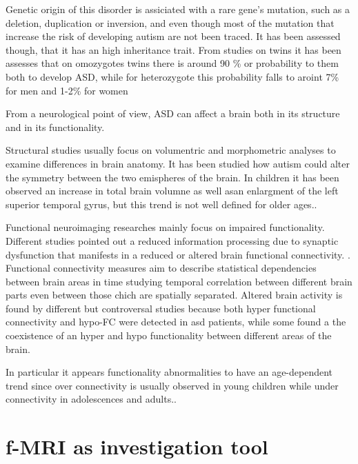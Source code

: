 \documentclass[10pt]{report}
\begin{document}
Genetic origin of this disorder is assiciated with a rare gene's mutation, such as a deletion, duplication or inversion, and even though most of the mutation that increase the risk of developing autism are not been traced.
It has been assessed though, that it has an high inheritance trait. From studies on twins it has been assesses that on omozygotes twins there is around 90 \% or probability to them both to develop ASD, while for heterozygote this probability falls to aroint 7\% for men and 1-2\% for women
\cite{freitag-2007}

From a neurological point of view, ASD can affect a brain both in its structure and in its functionality.

Structural studies usually focus on volumentric and morphometric analyses to examine differences in brain anatomy.
It has been studied how autism could alter the symmetry between the two emispheres \cite{postema2019} of the brain. In children it has been observed an increase in total brain volumne as well asan enlargment of the left superior temporal gyrus, but this trend is not well defined for older ages.\cite{riddler-2017}.


Functional neuroimaging researches mainly focus on impaired functionality. Different studies pointed out a reduced information processing due to synaptic dysfunction that manifests in a reduced or altered brain functional connectivity. \cite{spera-2019}.
Functional connectivity measures aim to describe statistical dependencies between brain areas in time studying temporal correlation between different brain parts even between those chich are spatially separated.
Altered brain activity is found by different but controversal studies because both hyper functional connectivity and hypo-FC were detected in asd patients, while some found a the coexistence of an hyper and hypo functionality between different areas of the brain.

In particular it appears functionality abnormalities to have an age-dependent trend since over connectivity is usually observed in young children while under connectivity in adolescences and adults.\cite{supekar-2013}.

\section{f-MRI as investigation tool}
\end{document}
